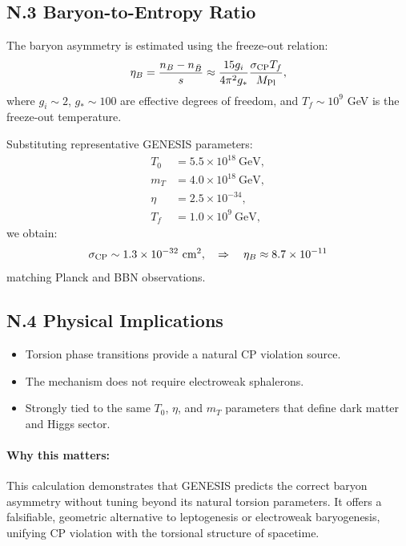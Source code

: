 \documentclass{article}
\begin{document}
\subsection*{N.3 Baryon-to-Entropy Ratio}
The baryon asymmetry is estimated using the freeze-out relation:
\begin{equation}
\eta_B = \frac{n_B - n_{\bar{B}}}{s} \approx \frac{15 g_i}{4\pi^2 g_*} \frac{\sigma_{\rm CP} T_f}{M_{\rm Pl}},
\end{equation}
where $g_i \sim 2$, $g_* \sim 100$ are effective degrees of freedom, and $T_f \sim 10^9$ GeV is the freeze-out temperature.

Substituting representative GENESIS parameters:
\begin{align*}
T_0 &= 5.5 \times 10^{18}~\text{GeV}, \\
m_T &= 4.0 \times 10^{18}~\text{GeV}, \\
\eta &= 2.5 \times 10^{-34}, \\
T_f &= 1.0 \times 10^9~\text{GeV},
\end{align*}
we obtain:
\begin{equation}
\sigma_{\rm CP} \sim 1.3 \times 10^{-32}~\text{cm}^2, \quad \Rightarrow \quad \eta_B \approx 8.7 \times 10^{-11}
\end{equation}
matching Planck and BBN observations.

\subsection*{N.4 Physical Implications}
\begin{itemize}
  \item Torsion phase transitions provide a natural CP violation source.
  \item The mechanism does not require electroweak sphalerons.
  \item Strongly tied to the same $T_0$, $\eta$, and $m_T$ parameters that define dark matter and Higgs sector.
\end{itemize}

\paragraph{Why this matters:}
This calculation demonstrates that GENESIS predicts the correct baryon asymmetry without tuning beyond its natural torsion parameters. It offers a falsifiable, geometric alternative to leptogenesis or electroweak baryogenesis, unifying CP violation with the torsional structure of spacetime.
\end{document}
